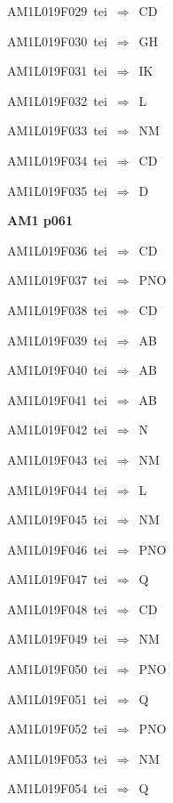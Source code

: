 {\sixrm AM1L019F029\ {\sixit tei}\ }$\Rightarrow$\ CD\par\smallskip
{\sixrm AM1L019F030\ {\sixit tei}\ }$\Rightarrow$\ GH\par\smallskip
{\sixrm AM1L019F031\ {\sixit tei}\ }$\Rightarrow$\ IK\par\smallskip
{\sixrm AM1L019F032\ {\sixit tei}\ }$\Rightarrow$\ L\par\smallskip
{\sixrm AM1L019F033\ {\sixit tei}\ }$\Rightarrow$\ NM\par\smallskip
{\sixrm AM1L019F034\ {\sixit tei}\ }$\Rightarrow$\ CD\par\smallskip
{\sixrm AM1L019F035\ {\sixit tei}\ }$\Rightarrow$\ D\par\smallskip

\par\vfill\eject
{\bf\hfill AM1 p061\hfill\hbox{}}\par\bigskip
{\sixrm AM1L019F036\ {\sixit tei}\ }$\Rightarrow$\ CD\par\smallskip
{\sixrm AM1L019F037\ {\sixit tei}\ }$\Rightarrow$\ PNO\par\smallskip
{\sixrm AM1L019F038\ {\sixit tei}\ }$\Rightarrow$\ CD\par\smallskip
{\sixrm AM1L019F039\ {\sixit tei}\ }$\Rightarrow$\ AB\par\smallskip
{\sixrm AM1L019F040\ {\sixit tei}\ }$\Rightarrow$\ AB\par\smallskip
{\sixrm AM1L019F041\ {\sixit tei}\ }$\Rightarrow$\ AB\par\smallskip
{\sixrm AM1L019F042\ {\sixit tei}\ }$\Rightarrow$\ N\par\smallskip
{\sixrm AM1L019F043\ {\sixit tei}\ }$\Rightarrow$\ NM\par\smallskip
{\sixrm AM1L019F044\ {\sixit tei}\ }$\Rightarrow$\ L\par\smallskip
{\sixrm AM1L019F045\ {\sixit tei}\ }$\Rightarrow$\ NM\par\smallskip
{\sixrm AM1L019F046\ {\sixit tei}\ }$\Rightarrow$\ PNO\par\smallskip
{\sixrm AM1L019F047\ {\sixit tei}\ }$\Rightarrow$\ Q\par\smallskip
{\sixrm AM1L019F048\ {\sixit tei}\ }$\Rightarrow$\ CD\par\smallskip
{\sixrm AM1L019F049\ {\sixit tei}\ }$\Rightarrow$\ NM\par\smallskip
{\sixrm AM1L019F050\ {\sixit tei}\ }$\Rightarrow$\ PNO\par\smallskip
{\sixrm AM1L019F051\ {\sixit tei}\ }$\Rightarrow$\ Q\par\smallskip
{\sixrm AM1L019F052\ {\sixit tei}\ }$\Rightarrow$\ PNO\par\smallskip
{\sixrm AM1L019F053\ {\sixit tei}\ }$\Rightarrow$\ NM\par\smallskip
{\sixrm AM1L019F054\ {\sixit tei}\ }$\Rightarrow$\ Q\par\smallskip

